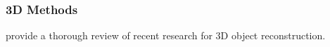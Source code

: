 





\subsubsection{3D Methods}

\textcite{han2019image} provide a thorough review of recent research for 3D object reconstruction. 


